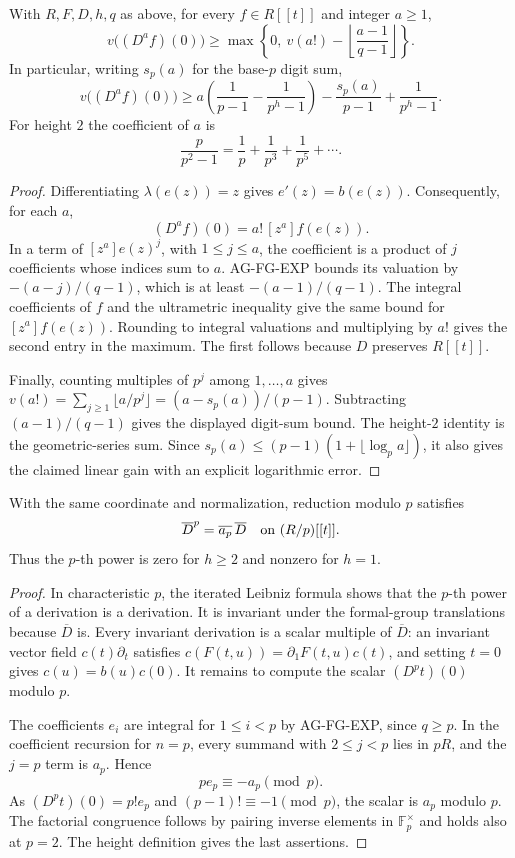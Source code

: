 \begin{proposition}
With $R,F,D,h,q$ as above, for every $f\in R[[t]]$ and integer
$a\ge1$,
\begin{equation}\label{eq:ag-height-derivative}
 v\bigl((D^af)(0)\bigr)\ge
 \max\left\{0,\ v(a!)-
                 \left\lfloor\frac{a-1}{q-1}\right\rfloor\right\}.
\end{equation}
In particular, writing $s_p(a)$ for the base-$p$ digit sum,
\[
 v\bigl((D^af)(0)\bigr)\ge
 a\left(\frac1{p-1}-\frac1{p^h-1}\right)
 -\frac{s_p(a)}{p-1}+\frac1{p^h-1}.
\]
For height $2$ the coefficient of $a$ is
\[
 \frac{p}{p^2-1}=\frac1p+\frac1{p^3}+\frac1{p^5}+\cdots.
\]
\end{proposition}
\begin{proof}
Differentiating $\lambda(e(z))=z$ gives $e'(z)=b(e(z))$.
Consequently, for each $a$,
\[
 (D^af)(0)=a!\,[z^a]f(e(z)).
\]
In a term of $[z^a]e(z)^j$, with $1\le j\le a$, the
coefficient is a product of $j$ coefficients whose indices sum
to $a$. AG-FG-EXP bounds its valuation by $-(a-j)/(q-1)$,
which is at least $-(a-1)/(q-1)$. The integral coefficients of
$f$ and the ultrametric inequality give the same bound for
$[z^a]f(e(z))$. Rounding to integral valuations and multiplying
by $a!$ gives the second entry in the maximum. The first follows
because $D$ preserves $R[[t]]$.

Finally, counting multiples of $p^j$ among $1,\ldots,a$ gives
$v(a!)=\sum_{j\ge1}\lfloor a/p^j\rfloor
=(a-s_p(a))/(p-1)$. Subtracting $(a-1)/(q-1)$ gives the
displayed digit-sum bound. The height-$2$ identity is the
geometric-series sum. Since
$s_p(a)\le(p-1)(1+\lfloor\log_pa\rfloor)$, it also gives the
claimed linear gain with an explicit logarithmic error.
\end{proof}

\begin{proposition}
With the same coordinate and normalization, reduction modulo $p$
satisfies
\[
 \overline D^{p}=\overline{a_p}\,\overline D
             \quad\hbox{on }(R/p)[[t]].
\]
Thus the $p$-th power is zero for $h\ge2$ and nonzero for $h=1$.
\end{proposition}
\begin{proof}
In characteristic $p$, the iterated Leibniz formula shows that
the $p$-th power of a derivation is a derivation. It is invariant
under the formal-group translations because $\overline D$ is.
Every invariant derivation is a scalar multiple of
$\overline D$: an invariant vector field $c(t)\partial_t$
satisfies $c(F(t,u))=\partial_1F(t,u)c(t)$, and setting $t=0$
gives $c(u)=b(u)c(0)$. It remains to compute the scalar
$(D^pt)(0)$ modulo $p$.

The coefficients $e_i$ are integral for $1\le i<p$ by
AG-FG-EXP, since $q\ge p$. In the coefficient recursion for
$n=p$, every summand with $2\le j<p$ lies in $pR$, and the
$j=p$ term is $a_p$. Hence
\[
 pe_p\equiv-a_p\pmod p.
\]
As $(D^pt)(0)=p!e_p$ and $(p-1)!\equiv-1\pmod p$,
the scalar is $a_p$ modulo $p$. The factorial congruence follows
by pairing inverse elements in $\mathbb F_p^\times$ and holds
also at $p=2$. The height definition gives the last assertions.
\end{proof}

